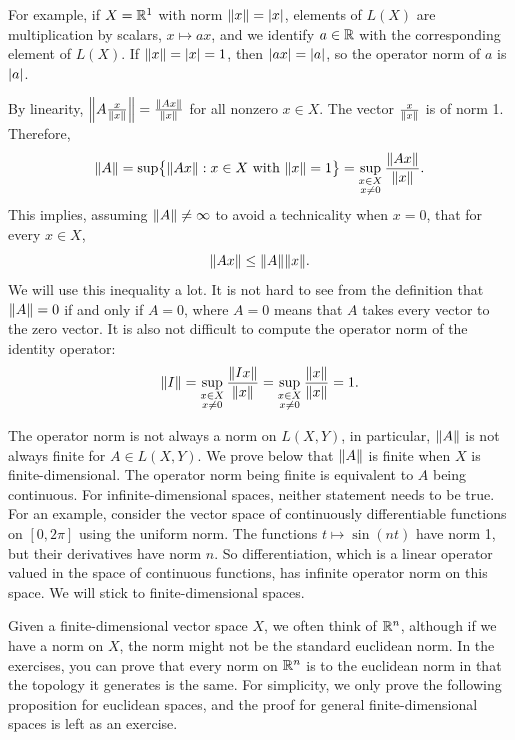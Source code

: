 For example, if $X={\mathbb{R}}^1$ with norm $\lVert {x} \rVert=\lvert {x} \rvert$, elements of $L(X)$
are multiplication by scalars, $x \mapsto ax$, and we identify $a \in {\mathbb{R}}$ with the
corresponding element of $L(X)$.  If $\lVert {x} \rVert=\lvert {x} \rvert=1$, then $\lvert {a x} \rvert = \lvert {a} \rvert$, so
the operator norm of $a$ is $\lvert {a} \rvert$.

By linearity,
$\left\lVert {A \frac{x}{\lVert {x} \rVert}} \right\rVert = \frac{\lVert {Ax} \rVert}{\lVert {x} \rVert}$
for all nonzero $x \in X$.
The vector $\frac{x}{\lVert {x} \rVert}$ is of norm 1.
Therefore,
\begin{equation*}
\lVert {A} \rVert =
\sup \bigl\{ \lVert {Ax} \rVert : x \in X \text{ with } \lVert {x} \rVert = 1 \bigr\}
=
\sup_{\substack{x \in X\\x\neq 0}} \frac{\lVert {Ax} \rVert}{\lVert {x} \rVert} .
\end{equation*}
This implies, assuming $\lVert {A} \rVert\not= \infty$ to avoid a technicality when $x=0$,
that for every $x \in X$,
\begin{equation*}
\lVert {Ax} \rVert \leq \lVert {A} \rVert  \lVert {x} \rVert .
\end{equation*}
We will use this inequality a lot.
It is not hard to see from the definition that $\lVert {A} \rVert = 0$ if and
only if $A = 0$, where $A=0$ means that $A$ takes every vector to the zero vector.
It is also not difficult to compute the operator norm of the identity operator:
\begin{equation*}
\lVert {I} \rVert =
\sup_{\substack{x \in X\\x\neq 0}} \frac{\lVert {Ix} \rVert}{\lVert {x} \rVert} 
=
\sup_{\substack{x \in X\\x\neq 0}} \frac{\lVert {x} \rVert}{\lVert {x} \rVert} 
= 1.
\end{equation*}

The operator norm is not always a norm on $L(X,Y)$, in particular,
$\lVert {A} \rVert$ is not always finite for $A \in L(X,Y)$.
We prove below that $\lVert {A} \rVert$ is finite when $X$ is finite-dimensional.
The operator norm being finite is equivalent to $A$ being continuous.
For infinite-dimensional spaces, neither statement needs to be true.
For an example,
consider the vector space of continuously differentiable functions on
$[0,2\pi]$ using the uniform norm.  The functions
$t \mapsto \sin(n t)$ have norm 1, but their derivatives have norm $n$.  So
differentiation, which is a linear operator valued in the space of
continuous functions, has infinite operator norm on this space.
We will stick to finite-dimensional spaces.

Given a finite-dimensional vector space $X$, we often think of
${\mathbb{R}}^n$, although if we have a norm on $X$, the norm might not be
the standard euclidean norm.  In the exercises, you can prove that
every norm on ${\mathbb{R}}^n$ is  to the euclidean norm in that the
topology it generates is the same.  For simplicity, we only prove the
following proposition for euclidean spaces, and the proof for general
finite-dimensional spaces is left as an exercise.

